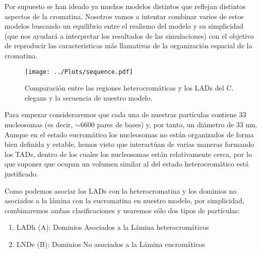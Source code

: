 Por supuesto se han ideado ya muchos modelos distintos que reflejan distintos aspectos de la cromatina. Nosotros vamos a intentar combinar varios de estos modelos buscando un equilibrio entre el realismo del modelo y su simplicidad (que nos ayudará a interpretar los resultados de las simulaciones) con el objetivo de reproducir las características más llamativas de la organización espacial de la cromatina.

\begin{figure}
    \centering
    \texttt{[image: ../Plots/sequence.pdf]}
    \caption{Comparación entre las regiones heterocromáticas y los LADs del C. elegans y la secuencia de nuestro modelo.}
    \label{fig:sequence}
\end{figure}

Para empezar consideraremos que cada una de nuestras partículas contiene 33 nucleosomas (es decir, $\sim6600$ pares de bases) y, por tanto, un diámetro de 33 nm. Aunque en el estado eucromático los nucleosomas no están organizados de forma bien definida y estable, hemos visto que interactúan de varias maneras formando los TADs, dentro de los cuales los nucleosomas están relativamente cerca, por lo que suponer que ocupan un volumen similar al del estado heterocromático está justificado.

Como podemos asociar los LADs con la heterocromatina y los dominios no asociados a la lámina con la eucromatina \cite{Bajpai2021} en nuestro modelo, por simplicidad, combinaremos ambas clasificaciones y usaremos sólo dos tipos de partículas:
\begin{enumerate}
    \item LADh (A): Dominios Asociados a la Lámina heterocromáticos
    \item LNDe (B): Dominios No asociados a la Lámina eucromáticos
\end{enumerate}

